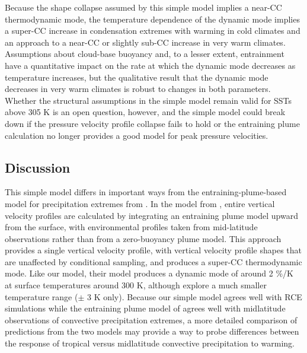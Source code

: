 \documentclass[twocol]{ametsoc}
\begin{document}
Because the shape collapse assumed by this simple model implies a near-CC thermodynamic mode, the temperature dependence of the dynamic mode implies a super-CC increase in condensation extremes with warming in cold climates and an approach to a near-CC or slightly sub-CC increase in very warm climates. Assumptions about cloud-base buoyancy and, to a lesser extent, entrainment have a quantitative impact on the rate at which the dynamic mode decreases as temperature increases, but the qualitative result that the dynamic mode decreases in very warm climates is robust to changes in both parameters. Whether the structural assumptions in the simple model remain valid for SSTs above 305 K is an open question, however, and the simple model could break down if the pressure velocity profile collapse fails to hold or the entraining plume calculation no longer provides a good model for peak pressure velocities.

\subsection{Discussion}

This simple model differs in important ways from the entraining-plume-based model for precipitation extremes from \citet{Loriaux2013UnderstandingModel}. In the model from \citet{Loriaux2013UnderstandingModel}, entire vertical velocity profiles are calculated by integrating an entraining plume model upward from the surface, with environmental profiles taken from mid-latitude observations rather than from a zero-buoyancy plume model. This approach provides a single vertical velocity profile, with vertical velocity profile shapes that are unaffected by conditional sampling, and produces a super-CC thermodynamic mode. Like our model, their model produces a dynamic mode of around 2 \%/K at surface temperatures around 300 K, although \citet{Loriaux2013UnderstandingModel} explore a much smaller temperature range ($\pm$ 3 K only). Because our simple model agrees well with RCE simulations while the entraining plume model of \citet{Loriaux2013UnderstandingModel} agrees well with midlatitude observations of convective precipitation extremes, a more detailed comparison of predictions from the two models may provide a way to probe differences between the response of tropical versus midlatitude convective precipitation to warming.
\end{document}
